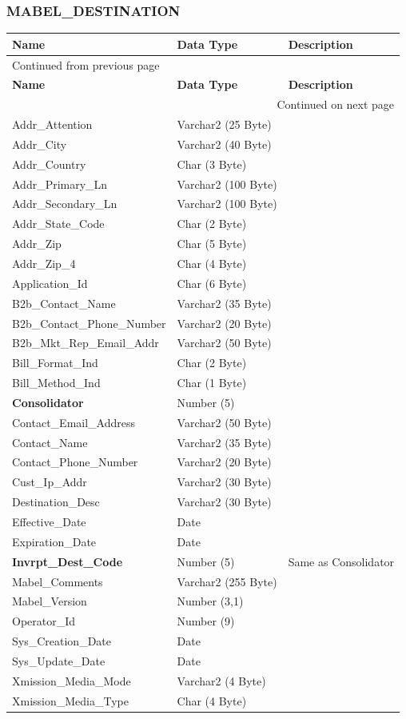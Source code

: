 \documentclass[12pt,twoside]{article}
\begin{document}
\subsubsection{MABEL\_DESTINATION}
\label{sec:orgheadline157}
\footnotesize

\begin{longtable}{l|l|l}
\hline
\textbf{Name} & \textbf{Data Type} & \textbf{Description}\\
\hline
\endfirsthead
\multicolumn{3}{l}{Continued from previous page} \\
\hline

\textbf{Name} & \textbf{Data Type} & \textbf{Description} \\

\hline
\endhead
\hline\multicolumn{3}{r}{Continued on next page} \\
\endfoot
\endlastfoot
\hline
Addr\_Attention & Varchar2 (25 Byte) & \\
Addr\_City & Varchar2 (40 Byte) & \\
Addr\_Country & Char (3 Byte) & \\
Addr\_Primary\_Ln & Varchar2 (100 Byte) & \\
Addr\_Secondary\_Ln & Varchar2 (100 Byte) & \\
Addr\_State\_Code & Char (2 Byte) & \\
Addr\_Zip & Char (5 Byte) & \\
Addr\_Zip\_4 & Char (4 Byte) & \\
Application\_Id & Char (6 Byte) & \\
B2b\_Contact\_Name & Varchar2 (35 Byte) & \\
B2b\_Contact\_Phone\_Number & Varchar2 (20 Byte) & \\
B2b\_Mkt\_Rep\_Email\_Addr & Varchar2 (50 Byte) & \\
Bill\_Format\_Ind & Char (2 Byte) & \\
Bill\_Method\_Ind & Char (1 Byte) & \\
\textbf{Consolidator} & Number (5) & \\
Contact\_Email\_Address & Varchar2 (50 Byte) & \\
Contact\_Name & Varchar2 (35 Byte) & \\
Contact\_Phone\_Number & Varchar2 (20 Byte) & \\
Cust\_Ip\_Addr & Varchar2 (30 Byte) & \\
Destination\_Desc & Varchar2 (30 Byte) & \\
Effective\_Date & Date & \\
Expiration\_Date & Date & \\
\textbf{Invrpt\_Dest\_Code} & Number (5) & Same as Consolidator\\
Mabel\_Comments & Varchar2 (255 Byte) & \\
Mabel\_Version & Number (3,1) & \\
Operator\_Id & Number (9) & \\
Sys\_Creation\_Date & Date & \\
Sys\_Update\_Date & Date & \\
Xmission\_Media\_Mode & Varchar2 (4 Byte) & \\
Xmission\_Media\_Type & Char (4 Byte) & \\
\hline
\end{longtable}
\end{document}
